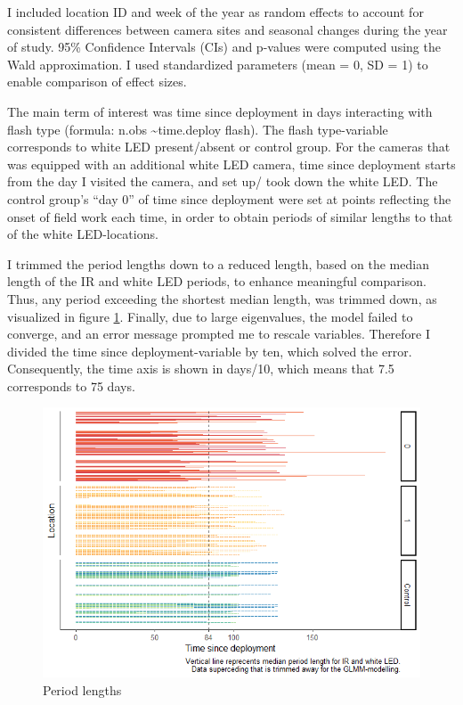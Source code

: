 I included location ID and week of the year as random effects to account for consistent differences between camera sites and seasonal changes during the year of study.
95\% Confidence Intervals (CIs) and p-values were computed using the Wald approximation.
I used standardized parameters (mean = 0, SD = 1) to enable comparison of effect sizes.

The main term of interest was time since deployment in days interacting with flash type (formula: n.obs \sim time.deploy \ast flash).
The flash type-variable corresponds to white LED present/absent or control group.
For the cameras that was equipped with an additional white LED camera, time since deployment starts from the day I visited the camera, and set up/ took down the white LED.
The control group’s “day 0” of time since deployment were set at points reflecting the onset of field work each time, in order to obtain periods of similar lengths to that of the white LED-locations.

I trimmed the period lengths down to a reduced length, based on the median length of the IR and white LED periods, to enhance meaningful comparison.
Thus, any period exceeding the shortest median length, was trimmed down, as visualized in figure \ref{fig:median_period}.
Finally, due to large eigenvalues, the model failed to converge, and an error message prompted me to rescale variables.
Therefore I divided the time since deployment-variable by ten, which solved the error. Consequently, the time axis is shown in days/10, which means that 7.5 corresponds to 75 days.


\begin{figure}
\caption{\label{fig:median_period} Period lengths}
	\centering
	\includegraphics[scale=.8]{../R/glmm_sp_files/figure-gfm/period-length-wControl-1.png}
\end{figure}



